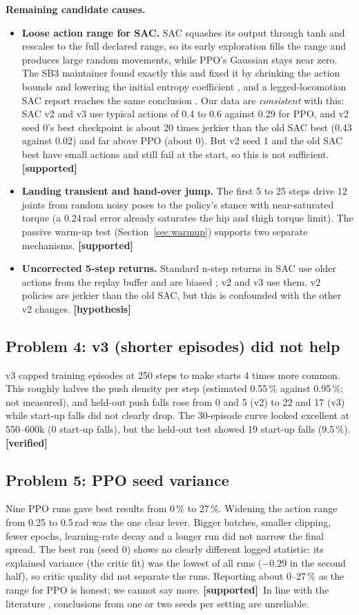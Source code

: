 \documentclass[11pt,a4paper]{article}
\newcommand{\tagv}{\textbf{[verified]}}
\newcommand{\tags}{\textbf{[supported]}}
\newcommand{\tagh}{\textbf{[hypothesis]}}
\begin{document}
\medskip\noindent\textbf{Remaining candidate causes.}\par\nopagebreak\smallskip
\begin{itemize}
\item \textbf{Loose action range for SAC.} SAC squashes its output through tanh and rescales to the full declared range, so its early exploration fills the range and produces large random movements, while PPO's Gaussian stays near zero. The SB3 maintainer found exactly this and fixed it by shrinking the action bounds and lowering the initial entropy coefficient \cite{araffin}, and a legged-locomotion SAC report reaches the same conclusion \cite{legged-sac}. Our data are \emph{consistent} with this: SAC v2 and v3 use typical actions of 0.4 to 0.6 against 0.29 for PPO, and v2 seed 0's best checkpoint is about 20 times jerkier than the old SAC best (0.43 against 0.02) and far above PPO (about 0). But v2 seed 1 and the old SAC best have small actions and still fail at the start, so this is not sufficient. \tags
\item \textbf{Landing transient and hand-over jump.} The first 5 to 25 steps drive 12 joints from random noisy poses to the policy's stance with near-saturated torque (a 0.24\,rad error already saturates the hip and thigh torque limit). The passive warm-up test (Section~\ref{sec:warmup}) supports two separate mechanisms. \tags
\item \textbf{Uncorrected 5-step returns.} Standard n-step returns in SAC use older actions from the replay buffer and are biased \cite{sacn}; v2 and v3 use them. v2 policies are jerkier than the old SAC, but this is confounded with the other v2 changes. \tagh
\end{itemize}

\subsection{Problem 4: v3 (shorter episodes) did not help}
v3 capped training episodes at 250 steps to make starts 4 times more common. This roughly halves the push density per step (estimated 0.55\,\% against 0.95\,\%; not measured), and held-out push falls rose from 0 and 5 (v2) to 22 and 17 (v3) while start-up falls did not clearly drop. The 30-episode curve looked excellent at 550--600k (0 start-up falls), but the held-out test showed 19 start-up falls (9.5\,\%). \tagv

\subsection{Problem 5: PPO seed variance}
Nine PPO runs gave best results from 0\,\% to 27\,\%. Widening the action range from 0.25 to 0.5\,rad was the one clear lever. Bigger batches, smaller clipping, fewer epochs, learning-rate decay and a longer run did not narrow the final spread. The best run (seed 0) shows no clearly different logged statistic: its explained variance (the critic fit) was the lowest of all runs ($-0.29$ in the second half), so critic quality did not separate the runs. Reporting about 0--27\,\% as the range for PPO is honest; we cannot say more. \tags\ In line with the literature \cite{henderson2018,agarwal2021}, conclusions from one or two seeds per setting are unreliable.
\end{document}
